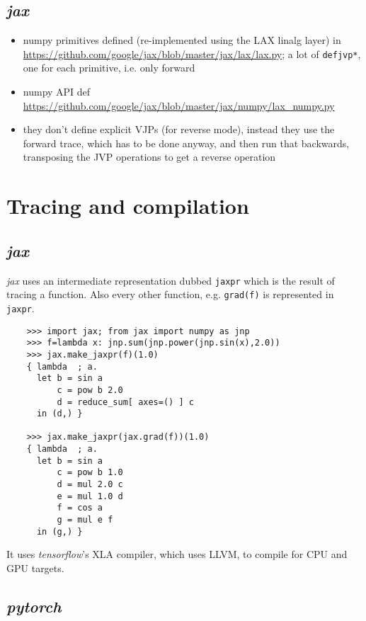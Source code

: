 \documentclass[paper=a4,11pt,headsepline]{scrartcl}
\newcommand{\soft}[1]{\textsl{#1}\xspace}
\newcommand{\pytorch}{\soft{pytorch}}
\newcommand{\jax}{\soft{jax}}
\newcommand{\tf}{\soft{tensorflow}}
\newcommand{\co}[1]{\texttt{#1}}
\begin{document}
\subsection{\jax}

\begin{itemize}
    \item numpy primitives defined (re-implemented using the LAX linalg layer) in
        \url{https://github.com/google/jax/blob/master/jax/lax/lax.py};
        a lot of \co{defjvp*}, one for each primitive, i.e. only forward
    \item numpy API def
        \url{https://github.com/google/jax/blob/master/jax/numpy/lax_numpy.py}
    \item they don't define explicit VJPs (for reverse mode), instead they use
        the forward trace, which has to be done anyway, and then run that
        backwards, transposing the JVP operations to get a reverse operation
\end{itemize}

\section{Tracing and compilation}

\subsection{\jax}

\jax uses an intermediate representation
dubbed \co{jaxpr} which is the result of tracing a function. Also every
other function, e.g. \co{grad(f)} is represented in \co{jaxpr}.

\begin{verbatim}
    >>> import jax; from jax import numpy as jnp
    >>> f=lambda x: jnp.sum(jnp.power(jnp.sin(x),2.0))
    >>> jax.make_jaxpr(f)(1.0)
    { lambda  ; a.
      let b = sin a
          c = pow b 2.0
          d = reduce_sum[ axes=() ] c
      in (d,) }

    >>> jax.make_jaxpr(jax.grad(f))(1.0)
    { lambda  ; a.
      let b = sin a
          c = pow b 1.0
          d = mul 2.0 c
          e = mul 1.0 d
          f = cos a
          g = mul e f
      in (g,) }
\end{verbatim}

It uses \tf's XLA compiler, which uses LLVM, to compile for CPU and GPU targets.

\subsection{\pytorch}
\end{document}
